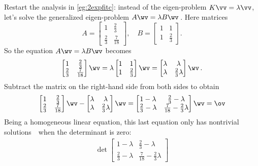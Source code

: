 \begin{reduce}
\begin{example}
\begin{solution} 
Restart the analysis in \autoref{eg:2expfitc}: instead of the eigen-problem \(K\vv=\lambda\vv\), let's solve the generalized eigen-problem \(A\wv=\lambda B\wv\)\,.
Here matrices
\begin{equation*}
A=\begin{bmatrix} 1&\frac23\\\frac23&\frac7{18} \end{bmatrix},\quad
B=\begin{bmatrix} 1&1\\1&\frac23 \end{bmatrix}.
\end{equation*}
So the equation \(A\wv=\lambda B\wv\) becomes
\begin{equation*}
\begin{bmatrix} 1&\frac23\\\frac23&\frac7{18} \end{bmatrix}\wv
=\lambda \begin{bmatrix} 1&1\\1&\frac23 \end{bmatrix}\wv
= \begin{bmatrix} \lambda&\lambda\\\lambda&\frac23\lambda \end{bmatrix}\wv\,.
\end{equation*}
Subtract the matrix on the right-hand side from both sides to obtain
\begin{equation*}
\begin{bmatrix} 1&\frac23\\\frac23&\frac7{18} \end{bmatrix}\wv
- \begin{bmatrix} \lambda&\lambda\\\lambda&\frac23\lambda \end{bmatrix}\wv 
=\begin{bmatrix} 1-\lambda&\frac23-\lambda\\\frac23-\lambda&\frac7{18}-\frac23\lambda \end{bmatrix}\wv
=\ov
\end{equation*}
Being a homogeneous linear equation, this last equation only has nontrivial solutions~\wv\ when the determinant is zero:
\begin{eqnarray*}
\det\begin{bmatrix} 1-\lambda&\tfrac23-\lambda\\\tfrac23-\lambda&\frac7{18}-\tfrac23\lambda\end{bmatrix}

\end{eqnarray*}
\end{solution}
\end{example}
\end{reduce}
